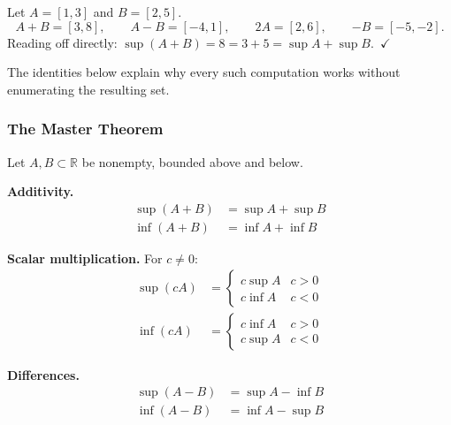\begin{remark*}
Let $A = [1,3]$ and $B = [2,5]$.
\[
  A + B = [3,8], \qquad
  A - B = [-4,1], \qquad
  2A = [2,6], \qquad
  {-B} = [-5,-2].
\]
Reading off directly: $\sup(A+B) = 8 = 3 + 5 = \sup A + \sup B$.~$\checkmark$

The identities below explain why every such computation works
without enumerating the resulting set.
\end{remark*}

\subsubsection{The Master Theorem}

\begin{tcolorbox}[colback=thmbox, colframe=thmborder, arc=2pt,
  left=6pt, right=6pt, top=4pt, bottom=4pt,
  title={\small\textbf{Theorem — Algebra of Suprema and Infima}},
  fonttitle=\small\bfseries]
\label{thm:bound-arithmetic-master}
Let $A, B \subset \mathbb{R}$ be nonempty, bounded above and below.

\medskip\noindent\textbf{Additivity.}
\begin{align}
\sup(A + B) &= \sup A + \sup B \label{eq:sup-add} \\
\inf(A + B) &= \inf A + \inf B \label{eq:inf-add}
\end{align}

\noindent\textbf{Scalar multiplication.} For $c \neq 0$:
\begin{align}
\sup(cA) &=
\begin{cases}
c\sup A & c > 0 \\[2pt]
c\inf A & c < 0
\end{cases}
\label{eq:sup-scale} \\[4pt]
\inf(cA) &=
\begin{cases}
c\inf A & c > 0 \\[2pt]
c\sup A & c < 0
\end{cases}
\label{eq:inf-scale}
\end{align}

\noindent\textbf{Differences.}
\begin{align}
\sup(A - B) &= \sup A - \inf B \label{eq:sup-diff} \\
\inf(A - B) &= \inf A - \sup B \label{eq:inf-diff}
\end{align}
\end{tcolorbox}

